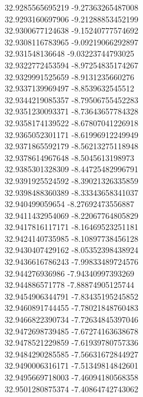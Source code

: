 {32.9285565695219	-9.27363265487008\\
32.9293160697906	-9.21288853452199\\
32.9300677124638	-9.15240777574692\\
32.9308116783965	-9.09219066292897\\
32.931548136648	-9.03223744793025\\
32.9322772453594	-8.97254835174267\\
32.9329991525659	-8.9131235660276\\
32.9337139969497	-8.8539632545512\\
32.9344219085357	-8.79506755452283\\
32.9351230093371	-8.73643657784328\\
32.9358174139522	-8.67807041226918\\
32.9365052301171	-8.61996912249949\\
32.9371865592179	-8.56213275118948\\
32.9378614967648	-8.5045613198973\\
32.9385301328309	-8.44725482996791\\
32.9391925524592	-8.39021326335859\\
32.9398488360389	-8.33343658341037\\
32.940499059654	-8.27692473556887\\
32.9411432954069	-8.22067764805829\\
32.9417816117171	-8.16469523251181\\
32.9424140735985	-8.10897738456128\\
32.9430407429162	-8.05352398438924\\
32.9436616786243	-7.99833489724576\\
32.944276936986	-7.94340997393269\\
32.944886571778	-7.88874905125744\\
32.9454906344791	-7.83435195245852\\
32.9460891744455	-7.78021848760483\\
32.9466822390734	-7.72634845397046\\
32.9472698739485	-7.67274163638678\\
32.9478521229859	-7.61939780757336\\
32.9484290285585	-7.56631672844927\\
32.9490006316171	-7.51349814842601\\
32.9495669718003	-7.46094180568358\\
32.9501280875374	-7.40864742743062\\
}
